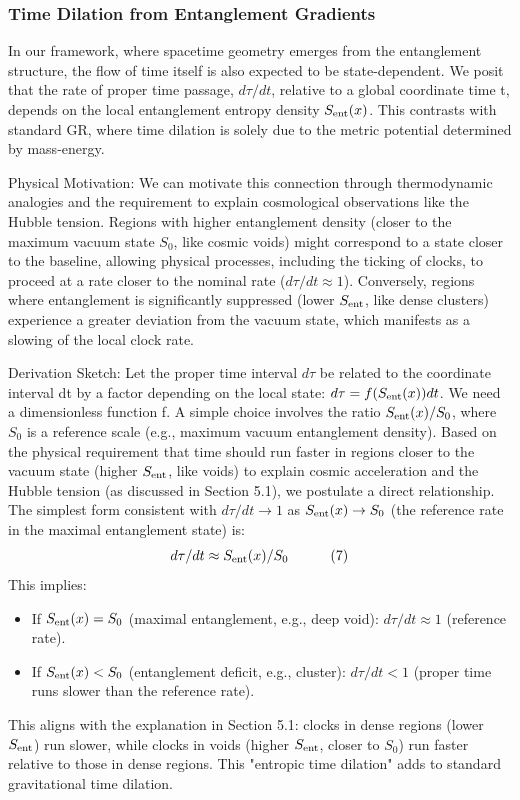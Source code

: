 \documentclass[11pt]{article}
\begin{document}
\subsubsection{Time Dilation from Entanglement Gradients} %

In our framework, where spacetime geometry emerges from the entanglement structure, the flow of time itself is also expected to be state-dependent. We posit that the rate of proper time passage, $d\tau/dt$, relative to a global coordinate time t, depends on the local entanglement entropy density $S_{\rm ent}(x)$. This contrasts with standard GR, where time dilation is solely due to the metric potential determined by mass-energy.  

Physical Motivation: We can motivate this connection through thermodynamic analogies and the requirement to explain cosmological observations like the Hubble tension. Regions with higher entanglement density (closer to the maximum vacuum state $S_0$, like cosmic voids) might correspond to a state closer to the baseline, allowing physical processes, including the ticking of clocks, to proceed at a rate closer to the nominal rate ($d\tau/dt \approx 1$). Conversely, regions where entanglement is significantly suppressed (lower $S_{\rm ent}$, like dense clusters) experience a greater deviation from the vacuum state, which manifests as a slowing of the local clock rate.  

Derivation Sketch: Let the proper time interval $d\tau$ be related to the coordinate interval dt by a factor depending on the local state: $d\tau = f(S_{\rm ent}(x)) dt$. We need a dimensionless function f. A simple choice involves the ratio $S_{\rm ent}(x) / S_0$, where $S_0$ is a reference scale (e.g., maximum vacuum entanglement density). Based on the physical requirement that time should run faster in regions closer to the vacuum state (higher $S_{\rm ent}$, like voids) to explain cosmic acceleration and the Hubble tension (as discussed in Section 5.1), we postulate a direct relationship. The simplest form consistent with $d\tau/dt \to 1$ as $S_{\rm ent}(x) \to S_0$ (the reference rate in the maximal entanglement state) is:
\begin{equation}
d\tau/dt \approx S_{\rm ent}(x) / S_0 \quad \tag{7} \label{eq:A7}
\end{equation}
This implies:
\begin{itemize}
    \item If $S_{\rm ent}(x) = S_0$ (maximal entanglement, e.g., deep void): $d\tau/dt \approx 1$ (reference rate).
    \item If $S_{\rm ent}(x) < S_0$ (entanglement deficit, e.g., cluster): $d\tau/dt < 1$ (proper time runs slower than the reference rate).
\end{itemize}
This aligns with the explanation in Section 5.1: clocks in dense regions (lower $S_{\rm ent}$) run slower, while clocks in voids (higher $S_{\rm ent}$, closer to $S_0$) run faster relative to those in dense regions. This "entropic time dilation" adds to standard gravitational time dilation.
\end{document}
